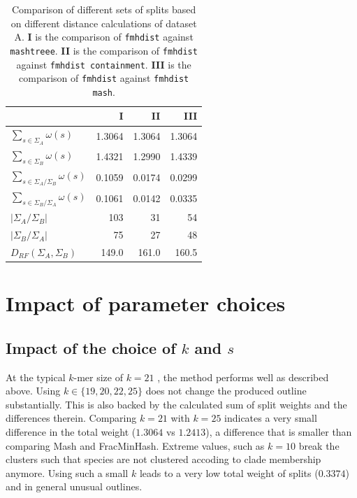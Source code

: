\begin{table}[]
  \centering
  \begin{tabular}{@{}lrrr@{}}
    \toprule
    &  \textbf{I} & \textbf{II} & \textbf{III} \\
    \midrule
  $\sum_{s \in \Sigma_A}{\omega(s)}$           & 1.3064                     & 1.3064                              & 1.3064                         \\
  $\sum_{s \in \Sigma_B}{\omega(s)}$           & 1.4321                     & 1.2990                              & 1.4339                         \\
  $\sum_{s \in \Sigma_A / \Sigma_B}{\omega(s)}$ & 0.1059                    & 0.0174                              & 0.0299                      \\
  $\sum_{s \in \Sigma_B / \Sigma_A}{\omega(s)}$ & 0.1061                    & 0.0142                             & 0.0335                       \\
  $|\Sigma_A / \Sigma_B|$                       & 103                       & 31                                 & 54                                        \\
  $|\Sigma_B / \Sigma_A|$                       & 75                        & 27                                 & 48                                        \\
  $D_{RF}(\Sigma_A, \Sigma_B)$                 & 149.0                       & 161.0                                & 160.5         \\
  \bottomrule                           
  \end{tabular}
  \caption{Comparison of different sets of splits based on different distance
  calculations of dataset A. \textbf{I} is the comparison of \texttt{fmhdist}
  against \texttt{mashtreee}. \textbf{II} is the comparison of \texttt{fmhdist}
  against \texttt{fmhdist containment}. \textbf{III} is the comparison of
  \texttt{fmhdist} against \texttt{fmhdist mash}.}
  \label{ta:splitDifferences}
\end{table}


\section{Impact of parameter choices}
\subsection*{Impact of the choice of $k$ and $s$}
At the typical $k$-mer size of $k=21$
\cite{mandalComparativeGenomeAnalysis2022,ondovMashFastGenome2016,irberLightweightCompositionalAnalysis2022},
the method performs well as described above. Using $k \in \{19, 20, 22, 25\}$
does not change the produced outline substantially. This is also backed by the
calculated sum of split weights and the differences therein. Comparing $k=21$
with $k=25$ indicates a very small difference in the total weight ($1.3064$ vs
$1.2413$), a difference that is smaller than comparing Mash and FracMinHash.
Extreme values, such as $k=10$ break the clusters such that species are not
clustered accoding to clade membership anymore. Using such a small $k$ leads to
a very low total weight of splits ($0.3374$) and in general unusual outlines.

